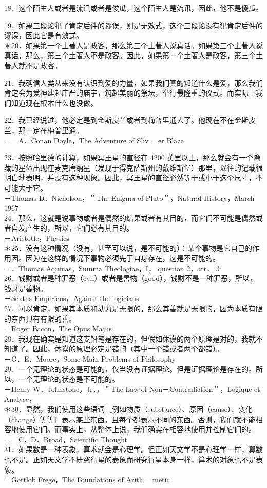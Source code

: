 18．这个陌生人或者是流讯或者是俊瓜，这个陌生人是流讯，因此，他不是傻瓜。

19．如果三段论犯了肯定后件的谬误，则是无效式，这个三段论没有犯肯定后件的谬误，因此它是有效式。\\
＊20．如果第一个土著人是政客，那么第三个土著人说真话。如果第三个土著人说真话，那么，第三个土著人不是政客。因此，如果第一个土著人是政客，第三个土著人就不是政客。

21．我确信人类从来没有认识到爱的力量，如果我们真的知道什么是爱，那么我们肯定会为爱神建起庄严的庙宇，筑起美丽的祭坛，举行最隆重的仪式。而实际上我们知道现在根本什么也没做。

22．我已经说过，他必定是到金斯皮兰或者到梅普里通去了。他现在不在金斯皮兰，那一定在梅普里通。\\
－－A．Conan Doyle，The Adventure of Sliv－ er Blaze

23．按照哈里德的计算，如果冥王星的直径在 4200 英里以上，那么就会有一个隐藏的星体出现在麦克唐纳星（发现于得克萨斯州的戴维斯堡）那里，以往的记载很明白地表明，并没有这种现象。因此，冥王星的直径必然等于或小于这个尺寸，不可能大于它。\\
－Thomas D．Nicholson，＂The Enigma of Pluto＂，Natural History，March 1967\\
24．那么，这就是说事物或者是偶然的结果或者有其目的，而它们不可能是偶然或者自发产生的，所以，它们必有其目的。\\
－Aristotle，Physics\\
＊25．没有这种情况（没有，甚至可以说，是不可能的）：某个事物是它自己的作用因。因为在这样的情况下事物必须先于自身存在，这是不可能的。\\
－．Thomas Aquinas，Summa Theologiae，I， question 2，art． 3\\
26．钱财或者是种罪恶（evil）或者是善物（good），钱财不是一种罪恶，所以，钱财是善物。\\
－Sextus Empiricus，Against the logicians\\
27．可以肯定，如果其本质和动力是无限的，那么其善就是无限的，因为本质有限的东西只有有限的善。\\
－Roger Bacon，The Opus Majus\\
28．我现在确实是知道这支铅笔是存在的，但假如休谟的两个原理是对的，我就不知道了。因此，休谟的原理必定是错的（其中一个错或者两个都错）。\\
－G．E．Moore，Some Main Problems of Philosophy\\
29．一个无理论的状态是可能的，仅当没有证据理论。但是证据理论是存在的。所以，一个无理论的状态是不可能的。\\
－Henry W．Johnstone，Jr．，＂The Law of Non－Contradiction＂，Logique et Analyse，\\
＊30．显然，我们使用这些语词［例如物质（substance）、原因（cause）、变化（change）等等］表示某些东西，且每个都表示不同的东西。否则，我们就不能相容地使用它们。而事实上，从整体上说，我们确实在相容地使用并控制它们的。\\
－－C．D．Broad，Scientific Thought\\
31．如果数是一种表象，算术就会是心理学。但正如天文学不是心理学一样，算数也不是。正如天文学不研究行星的表象而研究行星本身一样，算术的对象也不是表象。\\
－Gottlob Frege，The Foundations of Arith－ metic

